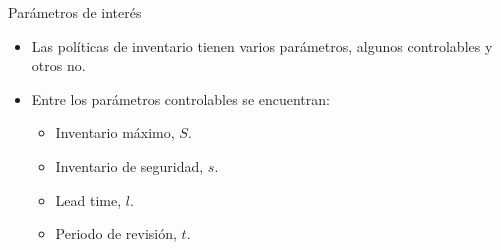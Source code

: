 \begin{frame}{Parámetros de interés}
    \begin{itemize}
        \item Las políticas de inventario tienen varios parámetros, algunos controlables y otros no.
        \item Entre los parámetros controlables se encuentran:
        \begin{itemize}
            \item Inventario máximo, $S$.
            \item Inventario de seguridad, $s$.
            \item Lead time, $l$.
            \item Periodo de revisión, $t$.
        \end{itemize}
    \end{itemize}
\end{frame}

